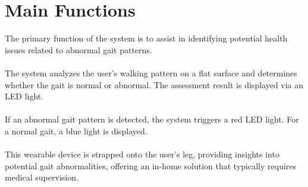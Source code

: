 \section{Main Functions}


The primary function of the system is to assist in identifying potential health issues related to abnormal gait patterns. \\ 
\\ The system analyzes the user’s walking pattern on a flat surface and determines whether the gait is normal or abnormal. The assessment result is displayed via an LED light.
\\ 
\\ 
If an abnormal gait pattern is detected, the system triggers a red LED light. For a normal gait, a blue light is displayed. \\ 
\\ This wearable device is strapped onto the user’s leg, providing insights into potential gait abnormalities, offering an in-home solution that typically requires medical supervision.
